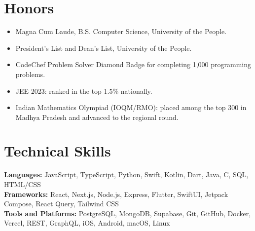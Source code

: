 \documentclass[letterpaper,10pt]{article}
\newcommand{\resumeItemListStart}{\begin{itemize}[leftmargin=0.18in,nosep,itemsep=1pt,topsep=2pt]}
\newcommand{\resumeItemListEnd}{\end{itemize}\vspace{-3pt}}
\newcommand{\resumeItem}[1]{\item\small #1}
\begin{document}
\section{Honors}
\resumeItemListStart
  \resumeItem{Magna Cum Laude, B.S. Computer Science, University of the People.}
  \resumeItem{President's List and Dean's List, University of the People.}
  \resumeItem{CodeChef Problem Solver Diamond Badge for completing 1,000 programming problems.}
  \resumeItem{JEE 2023: ranked in the top 1.5\% nationally.}
  \resumeItem{Indian Mathematics Olympiad (IOQM/RMO): placed among the top 300 in Madhya Pradesh and advanced to the regional round.}
\resumeItemListEnd

\section{Technical Skills}
\small
\textbf{Languages:} JavaScript, TypeScript, Python, Swift, Kotlin, Dart, Java, C, SQL, HTML/CSS \\
\textbf{Frameworks:} React, Next.js, Node.js, Express, Flutter, SwiftUI, Jetpack Compose, React Query, Tailwind CSS \\
\textbf{Tools and Platforms:} PostgreSQL, MongoDB, Supabase, Git, GitHub, Docker, Vercel, REST, GraphQL, iOS, Android, macOS, Linux
\end{document}
